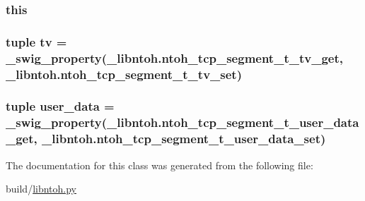 \hypertarget{classlibntoh_1_1ntoh__tcp__segment__t_a05c09a5e9d53fa7adf0a7936038c2fa3}{
\subsubsection[{this}]{\setlength{\rightskip}{0pt plus 5cm}this}}\label{classlibntoh_1_1ntoh__tcp__segment__t_a05c09a5e9d53fa7adf0a7936038c2fa3}
\hypertarget{classlibntoh_1_1ntoh__tcp__segment__t_ae8cd99ed1999062cbd69ce770384d6e4}{
\subsubsection[{tv}]{\setlength{\rightskip}{0pt plus 5cm}tuple tv = {\bf \-\_\-swig\-\_\-property}(\-\_\-libntoh.\-ntoh\-\_\-tcp\-\_\-segment\-\_\-t\-\_\-tv\-\_\-get, \-\_\-libntoh.\-ntoh\-\_\-tcp\-\_\-segment\-\_\-t\-\_\-tv\-\_\-set)\hspace{0.3cm}{\ttfamily [static]}}}\label{classlibntoh_1_1ntoh__tcp__segment__t_ae8cd99ed1999062cbd69ce770384d6e4}
\hypertarget{classlibntoh_1_1ntoh__tcp__segment__t_a12e096cd679ca576247a83b9fd1d62e4}{
\subsubsection[{user\-\_\-data}]{\setlength{\rightskip}{0pt plus 5cm}tuple user\-\_\-data = {\bf \-\_\-swig\-\_\-property}(\-\_\-libntoh.\-ntoh\-\_\-tcp\-\_\-segment\-\_\-t\-\_\-user\-\_\-data\-\_\-get, \-\_\-libntoh.\-ntoh\-\_\-tcp\-\_\-segment\-\_\-t\-\_\-user\-\_\-data\-\_\-set)\hspace{0.3cm}{\ttfamily [static]}}}\label{classlibntoh_1_1ntoh__tcp__segment__t_a12e096cd679ca576247a83b9fd1d62e4}


The documentation for this class was generated from the following file\-:\begin{DoxyCompactItemize}
\item 
build/\hyperlink{libntoh_8py}{libntoh.\-py}\end{DoxyCompactItemize}
